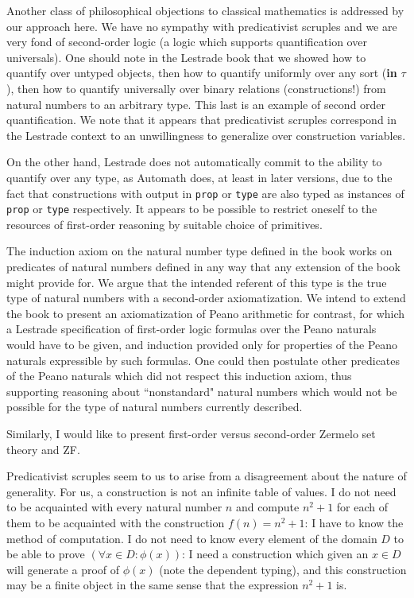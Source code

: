 \documentclass[12pt]{article}
\begin{document}
Another class of philosophical objections to classical mathematics is addressed by our approach here.   We have no sympathy with predicativist scruples and we are very fond of second-order logic (a logic which supports quantification over universals).   One should note in the Lestrade book that we showed how to quantify over untyped objects, then how to quantify uniformly over any sort ({\bf in} $\tau$), then how to quantify universally over binary relations (constructions!) from natural numbers to an arbitrary type.  This last is an example of second order quantification.  We note that it appears that predicativist scruples correspond in the Lestrade context to an unwillingness to generalize over construction variables.

On the other hand, Lestrade does not automatically commit to the ability to quantify over any type, as Automath does, at least in later versions, due to the fact that constructions with output in {\tt prop} or {\tt type} are also typed as instances of {\tt prop} or {\tt type} respectively.  It appears to be possible to restrict oneself to the resources of first-order reasoning by suitable choice of primitives.

The induction axiom on the natural number type defined in the book works on predicates of natural numbers defined in any way that any extension of the book might provide for.
We argue that the intended referent of this type is the true type of natural numbers with a second-order axiomatization.  We intend to extend the book to present an axiomatization of Peano arithmetic for contrast, for which a Lestrade specification of first-order logic formulas over the Peano naturals would have to be given, and induction provided only for properties of the Peano naturals expressible by such formulas.  One could then postulate other predicates of the Peano naturals which did not respect this induction axiom, thus supporting reasoning about ``nonstandard" natural numbers which would not be possible for the type of natural numbers currently described.

Similarly, I would like to present first-order versus second-order Zermelo set theory and ZF.

Predicativist scruples seem to us to arise from a disagreement about the nature of generality.  For us, a construction is not an infinite table of values.  I do not need to be acquainted with
every natural number $n$ and compute $n^2+1$ for each of them to be acquainted with the construction $f(n) = n^2+1$:  I have to know the method of computation.  I do not need
to know every element of the domain $D$ to be able to prove $(\forall x \in D:\phi(x))$:  I need a construction which given an $x \in D$ will generate a proof of $\phi(x)$ (note the dependent typing), and this construction may be a finite object in the same sense that the expression $n^2+1$ is.
\end{document}
